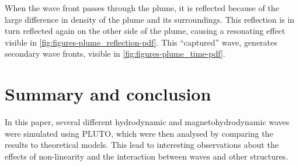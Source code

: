 \documentclass[a4paper]{article}
\numberwithin{figure}{section}
\numberwithin{equation}{section}
\begin{document}
When the wave front passes through the plume, it is reflected because of the large difference in density of the plume and its surroundings. This reflection is in turn reflected again on the other side of the plume, causing a resonating effect visible in \cref{fig:figures-plume_reflection-pdf}. This ``captured'' wave, generates secondary wave fronts, visible in \cref{fig:figures-plume_time-pdf}.

\section{Summary and conclusion}
In this paper, several different hydrodynamic and magnetohydrodynamic waves were simulated using PLUTO, which were then analysed by comparing the results to theoretical models. This lead to interesting observations about the effects of non-linearity and the interaction between waves and other structures.
\pagebreak
\printbibliography
\end{document}
